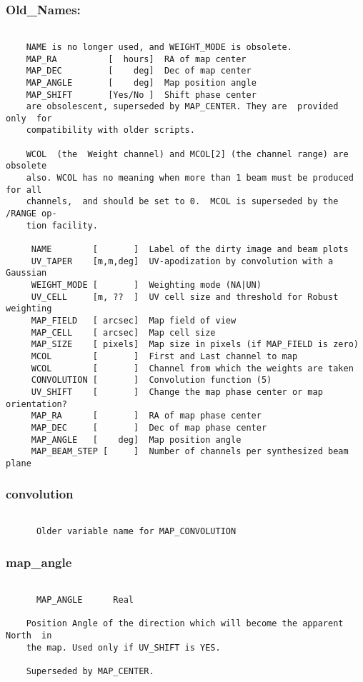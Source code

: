\subsubsection{Old\_Names:}
\begin{verbatim}

    NAME is no longer used, and WEIGHT_MODE is obsolete.
    MAP_RA          [  hours]  RA of map center
    MAP_DEC         [    deg]  Dec of map center
    MAP_ANGLE       [    deg]  Map position angle
    MAP_SHIFT       [Yes/No ]  Shift phase center
    are obsolescent, superseded by MAP_CENTER. They are  provided  only  for
    compatibility with older scripts.

    WCOL  (the  Weight channel) and MCOL[2] (the channel range) are obsolete
    also. WCOL has no meaning when more than 1 beam must be produced for all
    channels,  and should be set to 0.  MCOL is superseded by the /RANGE op-
    tion facility.

     NAME        [       ]  Label of the dirty image and beam plots
     UV_TAPER    [m,m,deg]  UV-apodization by convolution with a Gaussian
     WEIGHT_MODE [       ]  Weighting mode (NA|UN)
     UV_CELL     [m, ??  ]  UV cell size and threshold for Robust weighting
     MAP_FIELD   [ arcsec]  Map field of view
     MAP_CELL    [ arcsec]  Map cell size
     MAP_SIZE    [ pixels]  Map size in pixels (if MAP_FIELD is zero)
     MCOL        [       ]  First and Last channel to map
     WCOL        [       ]  Channel from which the weights are taken
     CONVOLUTION [       ]  Convolution function (5)
     UV_SHIFT    [       ]  Change the map phase center or map orientation?
     MAP_RA      [       ]  RA of map phase center
     MAP_DEC     [       ]  Dec of map phase center
     MAP_ANGLE   [    deg]  Map position angle
     MAP_BEAM_STEP [     ]  Number of channels per synthesized beam plane

\end{verbatim}
\subsubsection{convolution}
\begin{verbatim}

      Older variable name for MAP_CONVOLUTION

\end{verbatim}
\subsubsection{map\_angle}
\begin{verbatim}

      MAP_ANGLE      Real

    Position Angle of the direction which will become the apparent North  in
    the map. Used only if UV_SHIFT is YES.

    Superseded by MAP_CENTER.

\end{verbatim}
